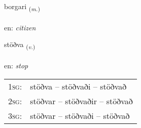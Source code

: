 \documentclass[frontgrid, backgrid]{flacards}\usepackage[]{graphicx}\usepackage[]{color}
\begin{document}
\renewcommand{\blhead}{\vskip5pt {\small\bfseries\footnotesize Nafnorð | Noun }}
\renewcommand{\bcfoot}{\vskip5pt \hspace{2pt}{\small\bfseries\footnotesize 2K}}


{borgari \small{\textsubscript{(\textit{m.})}} \\[1ex] %
\textphonetic{[pɔrkarɪ]} \\
en: \emph{citizen} \\  [2ex]
\renewcommand*{\arraystretch}{0.8}
}

\renewcommand{\flhead}{\vskip5pt \fboxsep=0pt {\small\bfseries\footnotesize Sagnorð | Verb}}
\renewcommand{\fcfoot}{\vskip5pt \fboxsep=0pt \hspace{2pt}{\small\bfseries\footnotesize 2K}}

\renewcommand{\blhead}{\vskip5pt {\small\bfseries\footnotesize Sagnorð | Verb }}
\renewcommand{\bcfoot}{\vskip5pt \hspace{2pt}{\small\bfseries\footnotesize 2K}}


{stöðva \small{\textsubscript{(\textit{v.})}} \\[1ex] %
\textphonetic{[stœðva]} \\
en: \emph{stop} \\  [2ex]
\renewcommand*{\arraystretch}{0.8}
\begin{tabular}{p{1cm}l}
\textsc{1sg}: & stöðva -- stöðvaði -- stöðvað \\ 
\textsc{2sg}: & stöðvar -- stöðvaðir -- stöðvað \\ 
\textsc{3sg}: & stöðvar -- stöðvaði -- stöðvað \\ 
\end{tabular}
}
\end{document}
